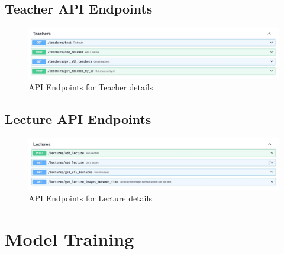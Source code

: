 \documentclass[openany]{report}
\begin{document}
\subsection{Teacher API Endpoints}
\begin{figure}[H]
    \centering
    \includegraphics[width=.99\textwidth]{../imgs/swagger 7.jpg}
    \caption{API Endpoints for Teacher details}
\end{figure}

\subsection{Lecture API Endpoints}
\begin{figure}[H]
    \centering
    \includegraphics[width=.99\textwidth]{../imgs/swagger 8.jpg}
    \caption{API Endpoints for Lecture details}

\end{figure}

\section{Model Training}
\end{document}
